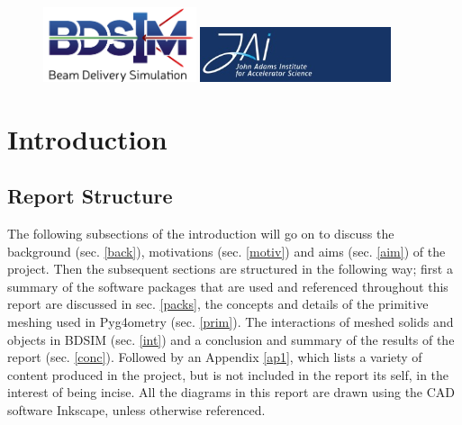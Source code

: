 \documentclass[12pt,a4paper]{article}
\begin{document}
\begin{titlepage}
\begin{figure}[h]
\centering
\begin{minipage}{.6\textwidth}
  \includegraphics[width=0.4\textwidth]{Images//Logos//BDSIM_Logo.jpg}
\end{minipage}%
\begin{minipage}{.6\textwidth}
  \centering
  \includegraphics[width=0.5\textwidth]{Images//Logos//JAI_Logo.jpeg}
  \end{minipage}
\end{figure}

\end{titlepage}
\leavevmode\thispagestyle{empty}\newpage
\tableofcontents
\normalsize
\thispagestyle{empty}
\newpage
\onecolumn

\small
\setcounter{page}{1}


\section{Introduction}

\subsection{Report Structure}
The following subsections of the introduction will go on to discuss the background (sec. \ref{back}), motivations (sec. \ref{motiv}) and aims (sec. \ref{aim}) of the project. Then the subsequent sections are structured in the following way; first a summary of the software packages that are used and referenced throughout this report are discussed in sec. \ref{packs}, the concepts and details of the primitive meshing used in Pyg4ometry (sec. \ref{prim}). The interactions of meshed solids and objects in BDSIM (sec. \ref{int}) and a conclusion and summary of the results of the report (sec. \ref{conc}). Followed by an Appendix \ref{ap1}, which lists a variety of content produced in the project, but is not included in the report its self, in the interest of being incise. All the diagrams in this report are drawn using the CAD software Inkscape, unless otherwise referenced.
\end{document}
